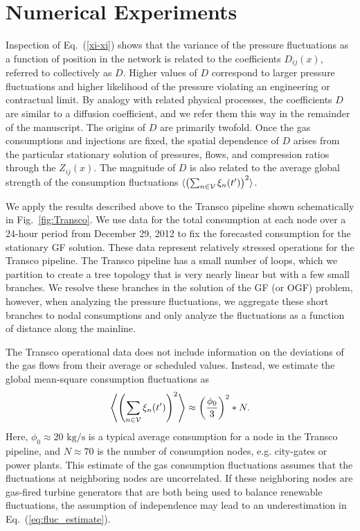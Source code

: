 \documentclass[10pt, conference, compsocconf]{IEEEtran}
\begin{document}
\section{Numerical Experiments}
\label{sec:exp}


Inspection of Eq.~(\ref{xi-xi}) shows that the variance of the pressure fluctuations as a function of position in the network is related to the coefficients $D_{ij}(x)$, referred to collectively as $D$. Higher values of $D$ correspond to larger pressure fluctuations and higher likelihood of the pressure violating an engineering or contractual limit.  By analogy with related physical processes, the coefficients $D$ are similar to a diffusion coefficient, and we refer them this way in the remainder of the manuscript.  The origins of $D$ are primarily twofold.  Once the gas consumptions and injections are fixed, the spatial dependence of $D$ arises from the particular stationary solution of pressures, flows, and compression ratios through the $Z_{ij}(x)$. The magnitude of $D$ is also related to the average global strength of the consumption fluctuations $\langle \left(\sum_{n\in{\cal V}}\xi_n(t')\right)^2\rangle$.

We apply the results described above to the Transco pipeline shown schematically in Fig.~\ref{fig:Transco}.  We use data for the total consumption at each node over a 24-hour period from December 29, 2012 to fix the forecasted consumption for the stationary GF solution. These data represent relatively stressed operations for the Transco pipeline.  The Transco pipeline has a small number of loops, which we partition to create a tree topology \cite{13MFBBCP} that is very nearly linear but with a few small branches.  We resolve these branches in the solution of the GF (or OGF) problem, however, when analyzing the pressure fluctuations, we aggregate these short branches to nodal consumptions and only analyze the fluctuations as a function of distance along the mainline.

The Transco operational data does not include information on the deviations of the gas flows from their average or scheduled values. Instead, we estimate the global mean-square consumption fluctuations as
\begin{equation}\label{eq:fluc_estimate}
\left\langle \left(\sum_{n\in{\cal V}}\xi_n(t')\right)^2\right\rangle \approx
\left(\frac{\phi_0}{3}\right)^2*N.
\end{equation}
Here, $\phi_0 \approx 20 \mbox{ kg/s}$ is a typical average consumption for a node in the Transco pipeline, and $N \approx 70$ is the number of consumption nodes, e.g. city-gates or power plants. This estimate of the gas consumption fluctuations assumes that the fluctuations at neighboring nodes are uncorrelated. If these neighboring nodes are gas-fired turbine generators that are both being used to balance renewable fluctuations, the assumption of independence may lead to an underestimation in Eq.~(\ref{eq:fluc_estimate}).
\end{document}

